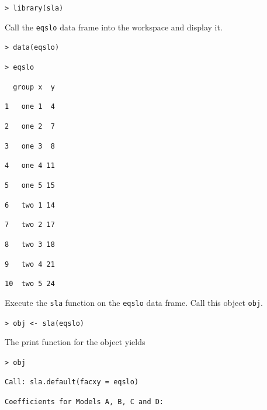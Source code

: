 \documentclass[11pt, oneside]{article}   	%
\begin{document}
\noindent \texttt{> library(sla)   } 

\vspace{3 mm}

\noindent Call the \texttt{eqslo} data frame into the workspace and display it.  



 
\vspace{3 mm}
 
\noindent \texttt{>  data(eqslo)} 

\vspace{3 mm}

\noindent \texttt{> eqslo}

\noindent \texttt{~~group x~  y}
   
\noindent \texttt{1~~    one 1~  4}

\noindent \texttt{2~~   one 2~  7}

\noindent \texttt{3~~    one 3~  8}

\noindent \texttt{4~~    one 4 11}

\noindent \texttt{5~~    one 5 15}

\noindent \texttt{6~~    two 1 14}

\noindent \texttt{7~~    two 2 17}

\noindent \texttt{8~~    two 3 18}

\noindent \texttt{9~~    two 4 21}

\noindent \texttt{10~   two 5 24}

\vspace{3 mm}
 
\noindent Execute the \texttt{sla} function on the \texttt{eqslo} data frame.  Call this object \texttt{obj}.



\vspace{3 mm}

\noindent \texttt{> obj <- sla(eqslo) }

\vspace{3 mm}

\noindent The print function for the object yields
\vspace{2 mm} 

\noindent \texttt{> obj}

\vspace{1 mm}
\noindent \texttt{Call:  sla.default(facxy = eqslo)}

\vspace{3 mm}
\noindent \texttt{Coefficients for Models A, B, C and D:}

\vspace{3 mm}
\end{document}
